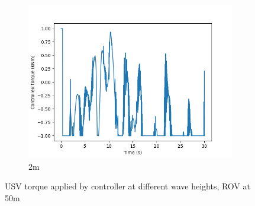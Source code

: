 \documentclass[class=article, crop=false]{standalone}
\begin{document}
\begin{figure}
\begin{subfigure}[b]{0.48\textwidth}
        \includegraphics{scenario1/rov-50m/2.0m/usv_torque}
        \caption{2m}
        \label{}
    \end{subfigure}

    \caption{USV torque applied by controller at different wave heights, ROV at 50m}
\end{figure}
\end{document}
